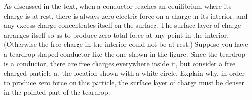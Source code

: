        As discussed in the text, when a conductor reaches an
        equilibrium where its charge is at rest, there is always
        zero electric force on a charge in its interior, and any
        excess charge concentrates itself on the surface.  The
        surface layer of charge arranges itself so as to produce
        zero total force at any point in the interior.  (Otherwise
        the free charge in the interior could not be at rest.) 
        Suppose you have a teardrop-shaped conductor like the one
        shown in the figure.  Since the teardrop is a conductor,
        there are free charges everywhere inside it, but consider a
        free charged particle at the location shown with a white
        circle. Explain why, in order to produce zero force on this
        particle, the surface layer of charge must be denser in the
        pointed part of the teardrop.

